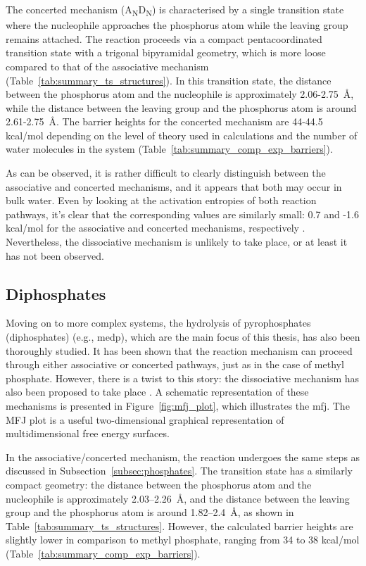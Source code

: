 The concerted mechanism (A\textsubscript{N}D\textsubscript{N}) is characterised by a single transition state \; where the nucleophile approaches the phosphorus atom while the leaving group remains attached. The reaction proceeds via a compact pentacoordinated transition state with a trigonal bipyramidal geometry, which is more loose compared to that of the associative mechanism (Table~\ref{tab:summary_ts_structures}). In this transition state, the distance between the phosphorus atom and the nucleophile is approximately 2.06-2.75~\AA, while the distance between the leaving group and the phosphorus atom is around 2.61-2.75~\AA. The barrier heights for the concerted mechanism are 44-44.5 kcal/mol depending on the level of theory used in calculations and the number of water molecules in the system (Table~\ref{tab:summary_comp_exp_barriers}).

As can be observed, it is rather difficult to clearly distinguish between the associative and concerted mechanisms, and it appears that both may occur in bulk water. Even by looking at the activation entropies of both reaction pathways, it's clear that the corresponding values are similarly small: 0.7 and -1.6 kcal/mol for the associative and concerted mechanisms, respectively \citep{duarteResolvingApparentConflicts2015}.  Nevertheless, the dissociative mechanism is unlikely to take place, or at least it has not been observed.



\subsection{Diphosphates} \label{subsec:diphosphates_reaction_mechanism}
Moving on to more complex systems, the hydrolysis of pyrophosphates (diphosphates) (e.g., \ac{medp}), which are the main focus of this thesis, has also been thoroughly studied. It has been shown that the reaction mechanism can proceed through either associative or concerted pathways, just as in the case of methyl phosphate. However, there is a twist to this story: the dissociative mechanism has also been proposed to take place \citep{klahnMechanismHydrolysisPhosphate2006, kamerlinAssociativeDissociativeMechanisms2008, prasadAddressingOpenQuestions2013}. A schematic representation of these mechanisms is presented in Figure~\ref{fig:mfj_plot}, which illustrates the \ac{mfj}. The MFJ plot is a useful two-dimensional graphical representation of multidimensional free energy surfaces.

In the associative/concerted mechanism, the reaction undergoes the same steps as discussed in Subsection~\ref{subsec:phosphates}. The transition state has a similarly compact geometry: the distance between the phosphorus atom and the nucleophile is approximately 2.03--2.26~\AA, and the distance between the leaving group and the phosphorus atom is around 1.82--2.4~\AA, as shown in Table~\ref{tab:summary_ts_structures}. However, the calculated barrier heights are slightly lower in comparison to methyl phosphate, ranging from 34 to 38 kcal/mol (Table~\ref{tab:summary_comp_exp_barriers}).

